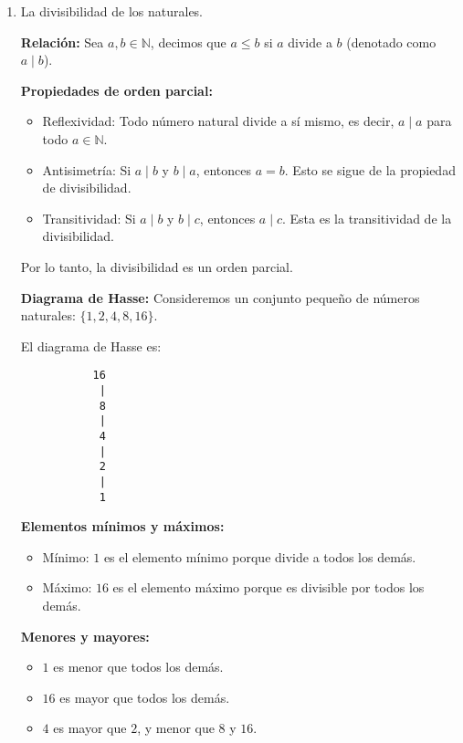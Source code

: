 \begin{solution}
    \begin{enumerate}
        \item La divisibilidad de los naturales.
        
        \textbf{Relación:}
        Sea \( a, b \in \mathbb{N} \), decimos que \( a \leq b \) si \( a \) divide a \( b \) (denotado como \( a \mid b \)).
        
        \textbf{Propiedades de orden parcial:}
        \begin{itemize}
            \item Reflexividad: Todo número natural divide a sí mismo, es decir, \( a \mid a \) para todo \( a \in \mathbb{N} \).
            \item Antisimetría: Si \( a \mid b \) y \( b \mid a \), entonces \( a = b \). Esto se sigue de la propiedad de divisibilidad.
            \item Transitividad: Si \( a \mid b \) y \( b \mid c \), entonces \( a \mid c \). Esta es la transitividad de la divisibilidad.
        \end{itemize}        
        Por lo tanto, la divisibilidad es un orden parcial.
        
        \textbf{Diagrama de Hasse:}
        Consideremos un conjunto pequeño de números naturales: \( \{1, 2, 4, 8, 16\} \).
        
        El diagrama de Hasse es:
        \begin{verbatim}
           16
            |
            8
            |
            4
            |
            2
            |
            1
        \end{verbatim}
        
        \textbf{Elementos mínimos y máximos:}
        \begin{itemize}
            \item Mínimo: \( 1 \) es el elemento mínimo porque divide a todos los demás.
            \item Máximo: \( 16 \) es el elemento máximo porque es divisible por todos los demás.
        \end{itemize}
        
        \textbf{Menores y mayores:}
        \begin{itemize}
            \item \( 1 \) es menor que todos los demás.
            \item \( 16 \) es mayor que todos los demás.
            \item \( 4 \) es mayor que \( 2 \), y menor que \( 8 \) y \( 16 \).
        \end{itemize}
        

\end{enumerate}
\end{solution}
